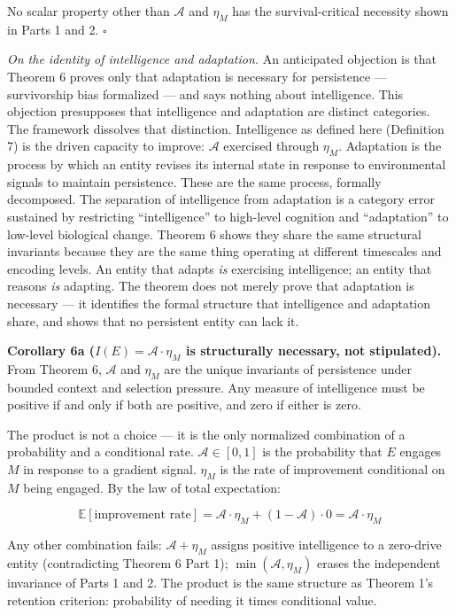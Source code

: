 \documentclass[
]{article}
\begin{document}
No scalar property other than \(\mathcal{A}\) and \(\eta_M\) has the
survival-critical necessity shown in Parts 1 and 2. \(\square\)

\emph{On the identity of intelligence and adaptation.} An anticipated
objection is that Theorem 6 proves only that adaptation is necessary for
persistence --- survivorship bias formalized --- and says nothing about
intelligence. This objection presupposes that intelligence and
adaptation are distinct categories. The framework dissolves that
distinction. Intelligence as defined here (Definition 7) is the driven
capacity to improve: \(\mathcal{A}\) exercised through \(\eta_M\).
Adaptation is the process by which an entity revises its internal state
in response to environmental signals to maintain persistence. These are
the same process, formally decomposed. The separation of intelligence
from adaptation is a category error sustained by restricting
``intelligence'' to high-level cognition and ``adaptation'' to
low-level biological change. Theorem 6 shows they share the same
structural invariants because they are the same thing operating at
different timescales and encoding levels. An entity that adapts
\emph{is} exercising intelligence; an entity that reasons \emph{is}
adapting. The theorem does not merely prove that adaptation is necessary
--- it identifies the formal structure that intelligence and adaptation
share, and shows that no persistent entity can lack it.

\textbf{Corollary 6a (\(I(E) = \mathcal{A} \cdot \eta_M\) is
structurally necessary, not stipulated).} From Theorem 6,
\(\mathcal{A}\) and \(\eta_M\) are the unique invariants of persistence
under bounded context and selection pressure. Any measure of
intelligence must be positive if and only if both are positive, and zero
if either is zero.

The product is not a choice --- it is the only normalized combination of
a probability and a conditional rate. \(\mathcal{A} \in [0,1]\) is the
probability that \(E\) engages \(M\) in response to a gradient signal.
\(\eta_M\) is the rate of improvement conditional on \(M\) being
engaged. By the law of total expectation:

\[\mathbb{E}[\text{improvement rate}] = \mathcal{A} \cdot \eta_M + (1 - \mathcal{A}) \cdot 0 = \mathcal{A} \cdot \eta_M\]

Any other combination fails: \(\mathcal{A} + \eta_M\) assigns positive
intelligence to a zero-drive entity (contradicting Theorem 6 Part 1);
\(\min(\mathcal{A}, \eta_M)\) erases the independent invariance of Parts
1 and 2. The product is the same structure as Theorem 1's retention
criterion: probability of needing it times conditional value.
\end{document}
